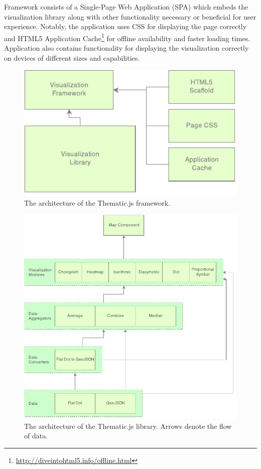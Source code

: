 Framework consists of a Single-Page Web Application (SPA) which embeds the visualization library along with other functionality necessary or beneficial for user experience. Notably, the application uses CSS for displaying the page correctly and HTML5 Application Cache\footnote{\url{http://diveintohtml5.info/offline.html}} for offline availability and faster loading times.  Application also contains functionality for displaying the visualization correctly on devices of different sizes and capabilities.

\begin{figure}[htbp]
  \centering
  \includegraphics[width=\textwidth]{images/framework-architecture.pdf}
  \caption{The architecture of the Thematic.js framework.}
  \label{fig:framework_architecture}
\end{figure}

\begin{figure}[htbp]
  \centering
  \includegraphics[width=\textwidth]{images/library-architecture.pdf}
  \caption{The architecture of the Thematic.js library. Arrows denote the flow of data.}
  \label{fig:lib_architecture}
\end{figure}

